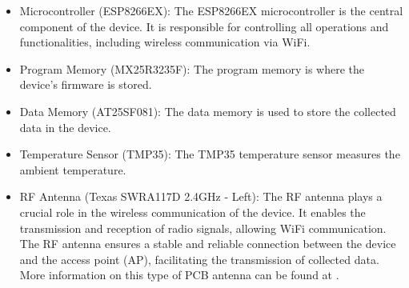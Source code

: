 \begin{itemize}
    \item Microcontroller (ESP8266EX): The ESP8266EX microcontroller is the central component of the device. It is responsible for 
    controlling all operations and functionalities, including wireless communication via WiFi.
    
    \item Program Memory (MX25R3235F): The program memory is where the device's firmware is stored. 

    \item Data Memory (AT25SF081): The data memory is used to store the collected data in the device.
    
    \item Temperature Sensor (TMP35): The TMP35 temperature sensor measures the ambient temperature.

    \item RF Antenna (Texas SWRA117D 2.4GHz - Left): The RF antenna plays a crucial role in the wireless communication of the device. It enables 
    the transmission and reception of radio signals, allowing WiFi communication. The RF antenna ensures a stable and reliable connection between 
    the device and the access point (AP), facilitating the transmission of collected data. More information on this type of PCB antenna can be 
    found at \cite{TexasRFAntenna}.

\end{itemize}


